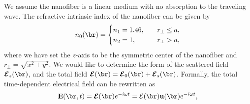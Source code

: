 \documentclass[]{report}
\begin{document}
We assume the nanofiber is a linear medium with no absorption to the traveling wave. The refractive intrinsic index of the nanofiber can be given by
\begin{align}
n_0(\br) = \begin{cases} 
n_1=1.46, &\quad r_\perp \leq a,\\
n_2=1, &\quad r_\perp >a,
\end{cases} 
\end{align}
where we have set the $ z $-axis to be the symmetric center of the nanofiber and $ r_\perp =\sqrt{x^2+y^2} $. We would like to determine the form of the scattered field $ \boldsymbol{\mathcal{E}}_s(\br) $, and the total field $ \boldsymbol{\mathcal{E}}(\br)=\boldsymbol{\mathcal{E}}_0(\br)+\boldsymbol{\mathcal{E}}_s(\br) $. Formally, the total time-dependent electrical field can be rewritten as 
\begin{equation}
\mathbf{E}(\br,t)=\boldsymbol{\mathcal{E}}(\br)e^{-i\omega t} %
=\mathcal{E}(\br)\mathbf{u}(\br)e^{-i\omega t}, %
\label{Ert}
\end{equation}
\end{document}
